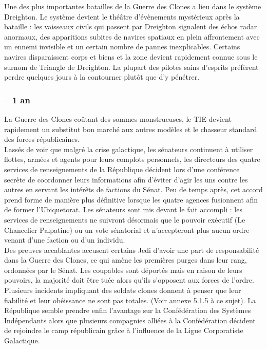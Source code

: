 \documentclass[twoside]{article}
\begin{document}
Une des plus importantes batailles de la Guerre des Clones a lieu dans le système Dreighton. Le système devient le théâtre d'évènements mystérieux après la bataille : les vaisseaux civils qui passent par Dreighton signalent des échos radar anormaux, des apparitions subites de navires spatiaux en plein affrontement avec un ennemi invisible et un certain nombre de pannes inexplicables. Certains navires disparaissent corps et biens et la zone devient rapidement connue sous le surnom de Triangle de Dreighton. La plupart des pilotes sains d'esprits préfèrent perdre quelques jours à la contourner plutôt que d'y pénétrer.

\subsubsection*{-- 1 an}
La Guerre des Clones coûtant des sommes monstrueuses, le TIE devient rapidement un substitut bon marché aux autres modèles et le chasseur standard des forces républicaines. \\

Lassés de voir que malgré la crise galactique, les sénateurs continuent à utiliser flottes, armées et agents pour leurs complots personnels, les directeurs des quatre services de renseignements de la République décident lors d'une conférence secrète de coordonner leurs informations afin d'éviter d'agir les uns contre les autres en servant les intérêts de factions du Sénat. Peu de temps après, cet accord prend forme de manière plus définitive lorsque les quatre agences fusionnent afin de former l'Ubiquetorat. Les sénateurs sont mis devant le fait accompli : les services de renseignements ne suivront désormais que le pouvoir exécutif (Le Chancelier Palpatine) ou un vote sénatorial et n'accepteront plus aucun ordre venant d'une faction ou d'un individu.\\

Des preuves accablantes accusent certains Jedi d'avoir une part de responsabilité dans la Guerre des Clones, ce qui amène les premières purges dans leur rang, ordonnées par le Sénat. Les coupables sont déportés mais en raison de leurs pouvoirs, la majorité doit être tuée alors qu'ils s'opposent aux forces de l'ordre. 
Plusieurs incidents impliquant des soldats clones donnent à penser que leur fiabilité et leur obéissance ne sont pas totales. (Voir annexe 5.1.5 à ce sujet). La République semble prendre enfin l'avantage sur la Confédération des Systèmes Indépendants alors que plusieurs compagnies alliées à la Confédération décident de rejoindre le camp républicain grâce à l'influence de la Ligue Corporatiste Galactique. \\
\end{document}
